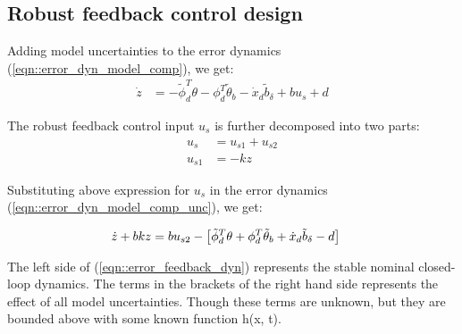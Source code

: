 \subsection{Robust feedback control design}

Adding model uncertainties to the error dynamics
(\ref{eqn::error_dyn_model_comp}), we get:
\begin{align}
    \dot z &= - \tilde \phi_d^T \theta - \phi_d^T \tilde \theta_b - \dot x_d \tilde b_{\delta} + b u_s + d
    \label{eqn::error_dyn_model_comp_unc}
\end{align}

The robust feedback control input $u_s$ is further decomposed into two parts:
\begin{align}
    u_s &= u_{s1} + u_{s2}\\
    u_{s1} &= - k z
\end{align}

Substituting above expression for $u_s$ in the error dynamics
(\ref{eqn::error_dyn_model_comp_unc}), we get:

\begin{align}
    \dot z + bk z &= bu_{s2} - \left[ 
        \tilde \phi_d^T \theta + \phi_d^T \tilde \theta_b + \dot x_d \tilde b_{\delta} - d \right]
    \label{eqn::error_feedback_dyn}
\end{align}

The left side of (\ref{eqn::error_feedback_dyn}) represents the stable nominal
closed-loop dynamics. The terms in the brackets of the right hand side
represents the effect of all model uncertainties. Though these terms are
unknown, but they are bounded above with some known function h(x, t).
